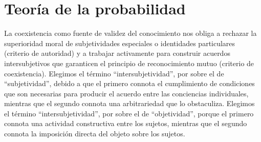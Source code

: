 \documentclass[a4paper,10pt]{book}
\theoremstyle{definition}
\begin{document}

\section{Teoría de la probabilidad}\label{sec:principios_interculturales}

La coexistencia como fuente de validez del conocimiento nos obliga a rechazar la superioridad moral de subjetividades especiales o identidades particulares (criterio de autoridad) y a trabajar activamente para construir acuerdos intersubjetivos que garanticen el principio de reconocimiento mutuo (criterio de coexistencia).
%
Elegimos el t\'ermino ``intersubjetividad'', por sobre el de ``subjetividad'', debido a que el primero connota el cumplimiento de condiciones que son necesarias para producir el acuerdo entre las conciencias individuales, mientras que el segundo connota una arbitrariedad que lo obstaculiza.
%
Elegimos el t\'ermino ``intersubjetividad'', por sobre el de ``objetividad'', porque el primero connota una actividad constructiva entre los sujetos, mientras que el segundo connota la imposici\'on directa del objeto sobre los sujetos.

\end{document}
